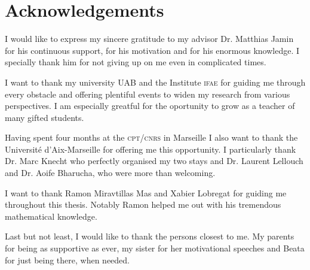 \documentclass[../../index.tex]{subfiles}
\begin{document}
\chapter*{Acknowledgements}
I would like to express my sincere gratitude to my advisor Dr. Matthias Jamin
for his continuous support, for his motivation and for his enormous knowledge. I
specially thank him for not giving up on me even in complicated times.


I want to thank my university \textsc{UAB} and the Institute \textsc{ifae} for
guiding me through every obstacle and offering plentiful events to widen my
research from various perspectives. I am especially greatful for the oportunity
to grow as a teacher of many gifted students.

Having spent four months at the \textsc{cpt}/\textsc{cnrs} in Marseille I also
want to thank the Université d'Aix-Marseille for offering me this opportunity. I
particularly thank Dr. Marc Knecht who perfectly organised my two stays and Dr.
Laurent Lellouch and Dr. Aoife Bharucha, who were more than welcoming.

I want to thank Ramon Miravtillas Mas and Xabier Lobregat for guiding me
throughout this thesis. Notably Ramon helped me out with his tremendous
mathematical knowledge.

Last but not least, I would like to thank the persons closest to me. My parents
for being as supportive as ever, my sister for her motivational speeches and
Beata for just being there, when needed.
\end{document}
